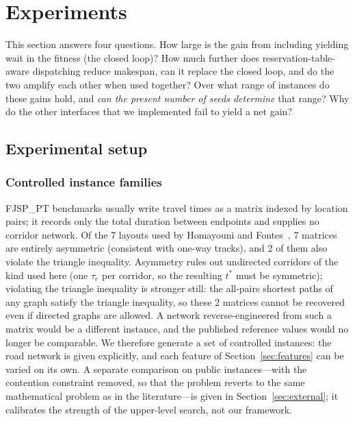 \documentclass[manuscript,screen,review]{acmart}
\newcommand{\PubNLayout}{7}
\newcommand{\PubNLayoutAsym}{7}           %
\newcommand{\PubNLayoutBad}{2}            %
\begin{document}
\section{Experiments}
\label{sec:Chapter_V}

This section answers four questions. How large is the gain from including yielding wait in the fitness (the closed loop)? How much further does reservation-table-aware dispatching reduce makespan, can it replace the closed loop, and do the two amplify each other when used together?
Over what range of instances do these gains hold, and \emph{can the present number of seeds determine} that range? Why do the other interfaces that we implemented fail to yield a net gain?

\subsection{Experimental setup}
\label{sec:instances}

\subsubsection{Controlled instance families}
FJSP\_PT benchmarks usually write travel times as a matrix indexed by location pairs; it records only the total duration between endpoints and supplies no corridor network.
Of the \PubNLayout{} layouts used by Homayouni and Fontes~\cite{homayouni2021production},
\PubNLayoutAsym{} matrices are entirely asymmetric (consistent with one-way tracks), and \PubNLayoutBad{} of them also violate the triangle inequality.
Asymmetry rules out undirected corridors of the kind used here (one $\tau_e$ per corridor, so the resulting $t^{*}$ must be symmetric);
violating the triangle inequality is stronger still: the all-pairs shortest paths of any graph satisfy the triangle inequality, so these \PubNLayoutBad{} matrices cannot be recovered even if directed graphs are allowed.
A network reverse-engineered from such a matrix would be a different instance, and the published reference values would no longer be comparable.
We therefore generate a set of controlled instances: the road network is given explicitly, and each feature of Section~\ref{sec:features} can be varied on its own.
A separate comparison on public instances---with the contention constraint removed, so that the problem reverts to the same mathematical problem as in the literature---is given in Section~\ref{sec:external}; it calibrates the strength of the upper-level search, not our framework.
\end{document}
